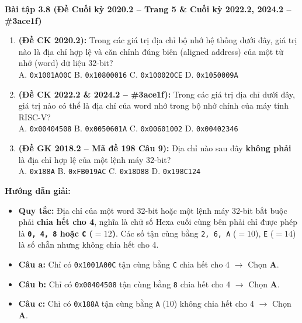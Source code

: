 \textbf{Bài tập 3.8 (Đề Cuối kỳ 2020.2 -- Trang 5 \& Cuối kỳ 2022.2, 2024.2 -- \#3ace1f)}
\begin{enumerate}[label=\alph*)]
    \item \textbf{(Đề CK 2020.2):} Trong các giá trị địa chỉ bộ nhớ hệ thống dưới đây, giá trị nào là địa chỉ hợp lệ và căn chỉnh đúng biên (aligned address) của một từ nhớ (word) dữ liệu 32-bit?\\
    A. \texttt{0x1001A00C} \quad B. \texttt{0x10800016} \quad C. \texttt{0x100020CE} \quad D. \texttt{0x1050009A}
    \item \textbf{(Đề CK 2022.2 \& 2024.2 -- \#3ace1f):} Trong các giá trị địa chỉ dưới đây, giá trị nào có thể là địa chỉ của word nhớ trong bộ nhớ chính của máy tính RISC-V?\\
    A. \texttt{0x00404508} \quad B. \texttt{0x0050601A} \quad C. \texttt{0x00601002} \quad D. \texttt{0x00402346}
    \item \textbf{(Đề GK 2018.2 -- Mã đề 198 Câu 9):} Địa chỉ nào sau đây \textbf{không phải} là địa chỉ hợp lệ của một lệnh máy 32-bit?\\
    A. \texttt{0x188A} \quad B. \texttt{0xFB019AC} \quad C. \texttt{0x18D88} \quad D. \texttt{0x198C124}
\end{enumerate}
\textbf{Hướng dẫn giải:}
\begin{itemize}
    \item \textbf{Quy tắc:} Địa chỉ của một word 32-bit hoặc một lệnh máy 32-bit bắt buộc phải \textbf{chia hết cho 4}, nghĩa là chữ số Hexa cuối cùng bên phải chỉ được phép là \textbf{\texttt{0, 4, 8} hoặc \texttt{C} ($=12$)}. Các số tận cùng bằng \texttt{2, 6, A} ($=10$), \texttt{E} ($=14$) là số chẵn nhưng không chia hết cho 4.
    \item \textbf{Câu a:} Chỉ có \texttt{0x1001A00C} tận cùng bằng \texttt{C} chia hết cho 4 $\rightarrow$ Chọn \textbf{A}.
    \item \textbf{Câu b:} Chỉ có \texttt{0x00404508} tận cùng bằng \texttt{8} chia hết cho 4 $\rightarrow$ Chọn \textbf{A}.
    \item \textbf{Câu c:} Chỉ có \texttt{0x188A} tận cùng bằng \texttt{A} ($10$) không chia hết cho 4 $\rightarrow$ Chọn \textbf{A}.
\end{itemize}

